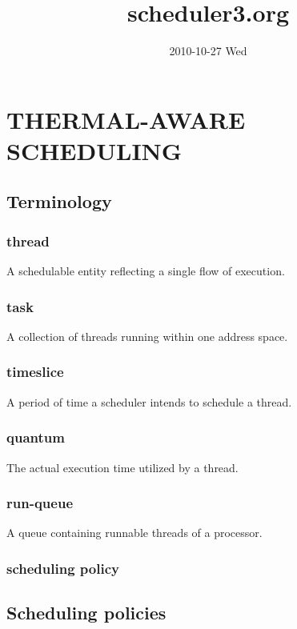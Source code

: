 \documentclass[11pt]{article}
\title{scheduler3.org}
\author{}
\date{2010-10-27 Wed}
\begin{document}
\maketitle

\setcounter{tocdepth}{3}
\tableofcontents
\vspace*{1cm}
\section{THERMAL-AWARE SCHEDULING}
\label{sec-1}
\subsection{Terminology}
\label{sec-1_1}
\subsubsection{thread}
\label{sec-1_1_1}

A schedulable entity reflecting a single flow of execution.
\subsubsection{task}
\label{sec-1_1_2}

A collection of threads running within one address space.
\subsubsection{timeslice}
\label{sec-1_1_3}

A period of time a scheduler intends to schedule a thread.
\subsubsection{quantum}
\label{sec-1_1_4}

The actual execution time utilized by a thread.
\subsubsection{run-queue}
\label{sec-1_1_5}

A queue containing runnable threads of a processor.
\subsubsection{scheduling policy}
\label{sec-1_1_6}
\subsection{Scheduling policies}
\label{sec-1_2}
\end{document}
